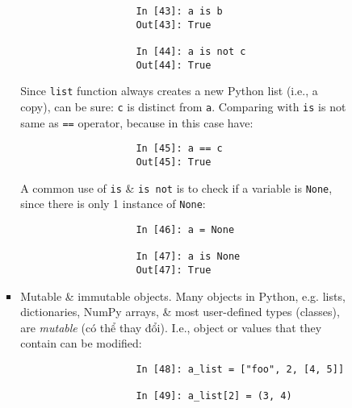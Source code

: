 \documentclass{article}
\begin{document}
\begin{itemize}
\begin{itemize}
\begin{itemize}
\begin{itemize}
\begin{verbatim}
					In [43]: a is b
					Out[43]: True
					
					In [44]: a is not c
					Out[44]: True
				\end{verbatim}
				Since {\tt list} function always creates a new Python list (i.e., a copy), can be sure: {\tt c} is distinct from {\tt a}. Comparing with {\tt is} is not same as {\tt==} operator, because in this case have:
				\begin{verbatim}
					In [45]: a == c
					Out[45]: True
				\end{verbatim}
				A common use of {\tt is} \& {\tt is not} is to check if a variable is {\tt None}, since there is only 1 instance of {\tt None}:
				\begin{verbatim}
					In [46]: a = None
					
					In [47]: a is None
					Out[47]: True
				\end{verbatim}
				\item {\sf Mutable \& immutable objects.} Many objects in Python, e.g. lists, dictionaries, NumPy arrays, \& most user-defined types (classes), are {\it mutable} (có thể thay đổi). I.e., object or values that they contain can be modified:
				\begin{verbatim}
					In [48]: a_list = ["foo", 2, [4, 5]]
					
					In [49]: a_list[2] = (3, 4)
					

\end{verbatim}
\end{itemize}
\end{itemize}
\end{itemize}
\end{itemize}
\end{document}

